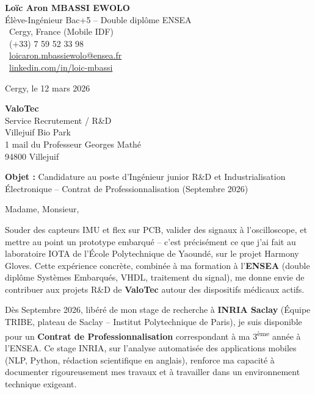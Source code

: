 \documentclass[a4paper,11pt]{article}
\begin{document}
\noindent
\begin{minipage}[t]{0.5\textwidth}
    \textbf{Loïc Aron MBASSI EWOLO}\\
    Élève-Ingénieur Bac+5 -- Double diplôme ENSEA\\[3pt]
    \faMapMarker\ Cergy, France (Mobile IDF)\\
    \faPhone\ (+33) 7 59 52 33 98\\
    \faEnvelope\ \href{mailto:loicaron.mbassiewolo@ensea.fr}{loicaron.mbassiewolo@ensea.fr}\\
    \faLinkedin\ \href{https://www.linkedin.com/in/loic-mbassi/}{linkedin.com/in/loic-mbassi}
\end{minipage}
\hfill
\begin{minipage}[t]{0.4\textwidth}
    \raggedleft
    Cergy, le 12 mars 2026
\end{minipage}

\vspace{1.2cm}

\hfill
\begin{minipage}[t]{0.5\textwidth}
    \raggedleft
    \textbf{ValoTec}\\
    Service Recrutement / R\&D\\
    Villejuif Bio Park\\
    1 mail du Professeur Georges Mathé\\
    94800 Villejuif
\end{minipage}

\vspace{1cm}

\noindent\textbf{Objet :} Candidature au poste d'Ingénieur junior R\&D et Industrialisation Électronique -- Contrat de Professionnalisation (Septembre 2026)

\vspace{0.8cm}

Madame, Monsieur,

Souder des capteurs IMU et flex sur PCB, valider des signaux à l'oscilloscope, et mettre au point un prototype embarqué -- c'est précisément ce que j'ai fait au laboratoire IOTA de l'École Polytechnique de Yaoundé, sur le projet Harmony Gloves. Cette expérience concrète, combinée à ma formation à l'\textbf{ENSEA} (double diplôme Systèmes Embarqués, VHDL, traitement du signal), me donne envie de contribuer aux projets R\&D de \textbf{ValoTec} autour des dispositifs médicaux actifs.

Dès Septembre 2026, libéré de mon stage de recherche à \textbf{INRIA Saclay} (Équipe TRIBE, plateau de Saclay -- Institut Polytechnique de Paris), je suis disponible pour un \textbf{Contrat de Professionnalisation} correspondant à ma 3\textsuperscript{ème} année à l'ENSEA. Ce stage INRIA, sur l'analyse automatisée des applications mobiles (NLP, Python, rédaction scientifique en anglais), renforce ma capacité à documenter rigoureusement mes travaux et à travailler dans un environnement technique exigeant.
\end{document}
